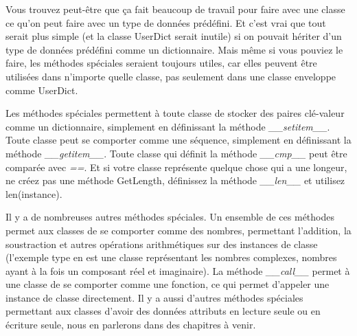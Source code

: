 
Vous trouvez peut-être que ça fait beaucoup de travail pour faire avec une classe ce qu'on peut faire avec un type de données prédéfini. Et c'est vrai que tout serait   plus simple (et la classe UserDict serait inutile) si on pouvait hériter d'un type de données prédéfini comme un dictionnaire. Mais même si vous pouviez le faire, les méthodes spéciales seraient toujours utiles, car elles peuvent être utilisées dans n'importe quelle classe, pas seulement dans une classe enveloppe comme UserDict.

Les méthodes spéciales permettent à toute classe de stocker des paires clé-valeur comme un dictionnaire, simplement en définissant la méthode \emph{\_\_setitem\_\_}. Toute classe peut se comporter comme une séquence, simplement en définissant la méthode \emph{\_\_getitem\_\_}. Toute classe qui définit la méthode \emph{\_\_cmp\_\_} peut être comparée avec \emph{==}. Et si votre classe représente quelque chose qui a une longeur, ne créez pas une méthode GetLength, définissez la méthode \emph{\_\_len\_\_} et utilisez len(instance).


Il y a de nombreuses autres méthodes spéciales. Un ensemble de ces méthodes permet aux classes de se comporter comme des nombres, permettant l'addition, la
soustraction et autres opérations arithmétiques sur des instances de classe (l'exemple type en est une classe représentant les nombres complexes, nombres ayant  à la fois un composant réel et imaginaire). La méthode \emph{\_\_call\_\_} permet à une classe de se comporter comme une fonction, ce qui permet d'appeler une instance de classe directement. Il y a aussi d'autres méthodes spéciales permettant aux classes d'avoir des données attributs en lecture seule ou en écriture seule, nous en parlerons dans des chapitres à venir.

